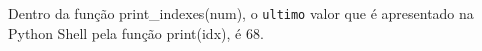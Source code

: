 \documentclass[12pt,varwidth=16cm,border=1pt]{standalone}
\begin{document}
Dentro da função print\_indexes(num), o \verb+ultimo+ valor que é apresentado na Python Shell pela função print(idx), é 68.

\questiomtrue
\end{document}
